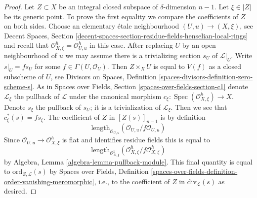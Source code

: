 \documentclass{stacks-project}
\theoremstyle{plain}
\theoremstyle{definition}
\theoremstyle{remark}
\numberwithin{equation}{subsection}
\def\Spec{\mathop{\mathrm{Spec}}}
\begin{document}
\begin{proof}
Let $Z \subset X$ be an integral closed subspace of $\delta$-dimension $n - 1$.
Let $\xi \in |Z|$ be its generic point. To prove the first equality
we compare the coefficients of $Z$ on both sides. Choose an elementary
\'etale neighbourhood $(U, u) \to (X, \xi)$, see
Decent Spaces, Section
\ref{decent-spaces-section-residue-fields-henselian-local-rings}
and recall that $\mathcal{O}_{X, \xi}^h = \mathcal{O}_{U, u}^h$
in this case. After replacing $U$ by an open neighbourhood
of $u$ we may assume there is a trivializing section
$s_U$ of $\mathcal{L}|_U$. Write $s|_U = f s_U$ for some
$f \in \Gamma(U, \mathcal{O}_U)$. Then $Z \times_X U$ is
equal to $V(f)$ as a closed subscheme of $U$, see
Divisors on Spaces, Definition \ref{spaces-divisors-definition-zero-scheme-s}.
As in Spaces over Fields, Section \ref{spaces-over-fields-section-c1}
denote $\mathcal{L}_\xi$ the pullback of $\mathcal{L}$
under the canonical morphism
$c_\xi : \Spec(\mathcal{O}_{X, \xi}^h) \to X$.
Denote $s_\xi$ the pullback of $s_U$; it is a trivialization of
$\mathcal{L}_\xi$. Then we see that
$c_\xi^*(s) = fs_\xi$. The coefficient of $Z$ in $[Z(s)]_{n - 1}$
is by definition
$$
\text{length}_{\mathcal{O}_{U, u}}(\mathcal{O}_{U, u}/f\mathcal{O}_{U, u})
$$
Since $\mathcal{O}_{U, u} \to \mathcal{O}_{X, \xi}^h$
is flat and identifies residue fields this is equal to
$$
\text{length}_{\mathcal{O}_{X, \xi}^h}
(\mathcal{O}_{X, \xi}^h/f\mathcal{O}_{X, \xi}^h)
$$
by Algebra, Lemma \ref{algebra-lemma-pullback-module}.
This final quantity is equal to $\text{ord}_{Z, \mathcal{L}}(s)$ by
Spaces over Fields, Definition
\ref{spaces-over-fields-definition-order-vanishing-meromorphic}, i.e.,
to the coefficient of $Z$ in
$\text{div}_\mathcal{L}(s)$
as desired.
\end{proof}
\end{document}
